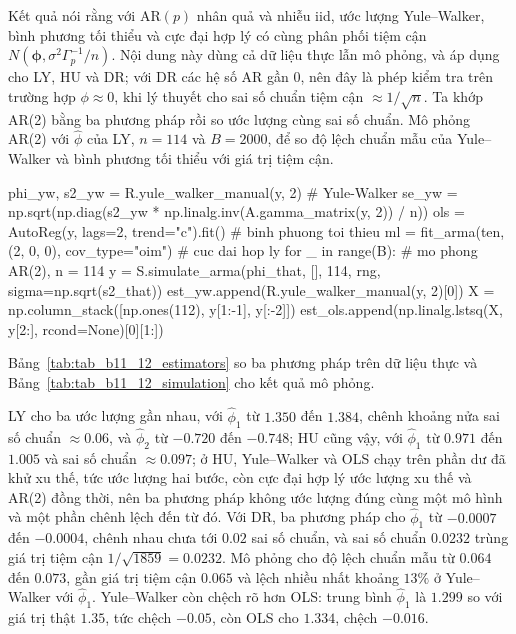  Kết quả  nói rằng với AR$(p)$ nhân quả và nhiễu iid, ước lượng Yule--Walker, bình phương tối thiểu và cực đại hợp lý có cùng phân phối tiệm cận $N(\boldsymbol\phi,\sigma^2\Gamma_p^{-1}/n)$.
 Nội dung này dùng cả dữ liệu thực lẫn mô phỏng, và áp dụng cho LY, HU và DR; với DR các hệ số AR gần $0$, nên đây là phép kiểm tra trên trường hợp $\phi\approx0$, khi lý thuyết cho sai số chuẩn tiệm cận $\approx1/\sqrt n$. Ta khớp AR(2) bằng ba phương pháp rồi so ước lượng cùng sai số chuẩn. Mô phỏng AR(2) với $\hat\phi$ của LY, $n=114$ và $B=2000$, để so độ lệch chuẩn mẫu của Yule--Walker và bình phương tối thiểu với giá trị tiệm cận.
\begin{codeblock}
phi_yw, s2_yw = R.yule_walker_manual(y, 2)                  # Yule-Walker
se_yw = np.sqrt(np.diag(s2_yw * np.linalg.inv(A.gamma_matrix(y, 2)) / n))
ols = AutoReg(y, lags=2, trend="c").fit()                   # binh phuong toi thieu
ml = fit_arma(ten, (2, 0, 0), cov_type="oim")               # cuc dai hop ly
for _ in range(B):                                          # mo phong AR(2), n = 114
    y = S.simulate_arma(phi_that, [], 114, rng, sigma=np.sqrt(s2_that))
    est_yw.append(R.yule_walker_manual(y, 2)[0])
    X = np.column_stack([np.ones(112), y[1:-1], y[:-2]])
    est_ols.append(np.linalg.lstsq(X, y[2:], rcond=None)[0][1:])
\end{codeblock}
 Bảng~\ref{tab:tab_b11_12_estimators} so ba phương pháp trên dữ liệu thực và Bảng~\ref{tab:tab_b11_12_simulation} cho kết quả mô phỏng.


 LY cho ba ước lượng gần nhau, với $\hat\phi_1$ từ $1.350$ đến $1.384$, chênh khoảng nửa sai số chuẩn $\approx0.06$, và $\hat\phi_2$ từ $-0.720$ đến $-0.748$; HU cũng vậy, với $\hat\phi_1$ từ $0.971$ đến $1.005$ và sai số chuẩn $\approx0.097$; ở HU, Yule--Walker và OLS chạy trên phần dư đã khử xu thế, tức ước lượng hai bước, còn cực đại hợp lý ước lượng xu thế và AR(2) đồng thời, nên ba phương pháp không ước lượng đúng cùng một mô hình và một phần chênh lệch đến từ đó. Với DR, ba phương pháp cho $\hat\phi_1$ từ $-0.0007$ đến $-0.0004$, chênh nhau chưa tới $0.02$ sai số chuẩn, và sai số chuẩn $0.0232$ trùng giá trị tiệm cận $1/\sqrt{1859}=0.0232$. Mô phỏng cho độ lệch chuẩn mẫu từ $0.064$ đến $0.073$, gần giá trị tiệm cận $0.065$ và lệch nhiều nhất khoảng $13\%$ ở Yule--Walker với $\hat\phi_1$. Yule--Walker còn chệch rõ hơn OLS: trung bình $\hat\phi_1$ là $1.299$ so với giá trị thật $1.35$, tức chệch $-0.05$, còn OLS cho $1.334$, chệch $-0.016$.

